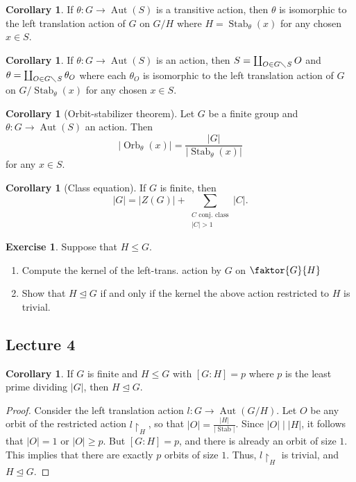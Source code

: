 \documentclass[10pt,letterpaper,cm]{nupset}
\theoremstyle{definition}
\theoremstyle{theorem}
\newtheorem{corollary}[definition]{Corollary}
\newtheorem{exercise}[definition]{Exercise}
\theoremstyle{remark}
\newcommand{\1}{\mathbf{1}}
\newcommand{\0}{\vec 0}
\DeclareMathOperator{\aut}{Aut}
\DeclareMathOperator{\stab}{Stab}
\DeclareMathOperator{\orb}{Orb}
\begin{document}
\begin{corollary}
If $\theta : G \to \aut(S)$ is a transitive action, then $\theta$ is isomorphic to the left translation action of $G$ on $G/H$ where $H = \stab_{\theta}(x)$ for any chosen $x\in S$.
\end{corollary}

\begin{corollary}
If $\theta : G \to \aut(S)$ is an action, then $S = \coprod_{O \in G\diagdown S} O$ and $\theta = \coprod_{O \in G \diagdown S} \theta_O$ where each $\theta_O$ is isomorphic to the left translation action of $G$ on $G/\stab_{\theta}(x)$ for any chosen $x\in S$. 
\end{corollary}

\begin{corollary}[Orbit-stabilizer theorem]
Let $G$ be a finite group and $\theta : G \to \aut(S)$ an action. Then $$ \lvert{\orb_{\theta}(x)}\rvert = \frac{|G|}{\lvert{\stab_{\theta}(x)}\rvert}     $$ for any $x\in S$. 
\end{corollary}

\begin{corollary}[Class equation]
If $G$ is finite, then $$|G| = |Z(G)| + \sum_{{\substack{C \text{ conj. class} \\ |C| >1}}} |C|     .$$
\end{corollary}

\begin{exercise}{Suppose that $H \leq G$.}
\begin{enumerate}
\item Compute the kernel of the left-trans. action by $G$ on $\faktor{G}{H}$
\item Show that $H \unlhd G$  if and only if the kernel the above action restricted to $H$ is trivial. 
\end{enumerate}
\end{exercise}

\subsection{Lecture 4}

\begin{corollary} If $G$ is finite and $H\leq G$ with $[G:H] =p$ where $p$ is the least prime dividing $|G|$, then $H\unlhd G$.
\end{corollary}
\begin{proof}
Consider the left translation action $l : G \to \aut(G/H)$. Let $O$ be any orbit of the restricted action $l\restriction_H$, so that $|O| = \frac{|H|}{\lvert{\stab}\rvert}$. Since $|O| \mid |H|$, it follows that $|O|=1$ or $|O| \geq p$. But $[G:H] = p$, and there is already an orbit of size $1$. This implies that there are exactly $p$ orbits of size $1$. Thus, $l\restriction_H$ is trivial, and $H \unlhd G$.
\end{proof}
\end{document}
